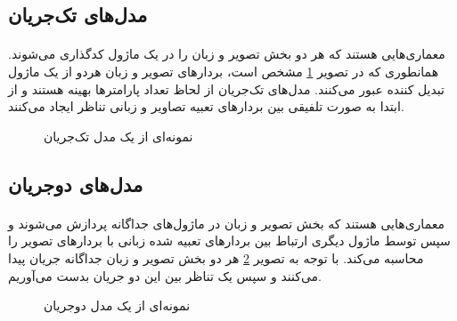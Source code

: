 \subsection{
    مدل‌های تک‌جریان
}
\label{subsec:single-stream-models}
\paragraph{}
{
    معماری‌هایی هستند که هر دو بخش تصویر و زبان را در یک ماژول کدگذاری می‌شوند. 
    همانطوری که در تصویر 
    \ref{fig:single_stream}
    مشخص است، بردار‌های تصویر و زبان هردو از یک ماژول تبدیل کننده عبور می‌کنند. 
    مدل‌های تک‌جریان از لحاظ تعداد پارامترها بهینه هستند و از ابتدا به صورت 
    تلفیقی بین بردار‌های تعبیه تصاویر و زبانی تناظر ایجاد می‌کنند.
    \begin{figure}[H]
        \caption{نمونه‌ای از یک مدل تک‌جریان}
        \label{fig:single_stream}
    \end{figure}
}

\subsection{
    مدل‌های دوجریان
}
\label{subsec:dual-stream-models}
\paragraph{}
{
    معماری‌هایی هستند که بخش تصویر و زبان در ماژول‌های جداگانه پردازش می‌شوند و 
    سپس توسط ماژول دیگری ارتباط بین بردار‌های تعبیه شده زبانی با بردارهای 
    تصویر را محاسبه می‌کند. 
    با توجه به تصویر
    \ref{fig:dual_stream}
    هر دو بخش تصویر و زبان جداگانه جریان پیدا می‌کنند و سپس
    یک تناظر بین این دو جریان بدست می‌آوریم. 
    \begin{figure}[H]
        \caption{نمونه‌ای از یک مدل دوجریان}
        \label{fig:dual_stream}
    \end{figure}
}


